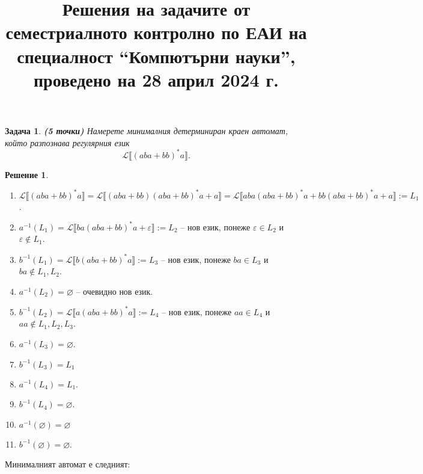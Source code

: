 \documentclass{article}
\newtheorem{problem}{Задача}
\theoremstyle{definition}
\newtheorem*{solution}{Решение}
\begin{document}
\title{Решения на задачите от семестриалното контролно по ЕАИ на специалност ``Компютърни науки'', проведено на 28 април 2024 г.}
\date{}

\newcommand{\N}{\mathbb{N}}
\newcommand{\A}{\mathcal{A}}
\newcommand{\calL}{\mathcal{L}}

\maketitle

\begin{problem} {\bf (5 точки)}
Намерете минималния детерминиран краен автомат, който разпознава регулярния език
\[
    \calL \llbracket (aba + bb)^* a \rrbracket.
\]
\end{problem}

\begin{solution}
    \phantom{}
    \begin{enumerate}
        \item $\calL \llbracket (aba + bb)^* a \rrbracket = \calL \llbracket (aba + bb)(aba + bb)^* a + a \rrbracket = \calL \llbracket aba(aba + bb)^* a + bb(aba + bb)^* a + a \rrbracket := L_1$.
        \item $a^{-1}(L_1) = \calL \llbracket ba(aba + bb)^* a + \varepsilon \rrbracket := L_2$ -- нов език, понеже $\varepsilon \in L_2$ и $\varepsilon \notin L_1$.
        \item $b^{-1}(L_1) = \calL \llbracket b(aba + bb)^* a \rrbracket := L_3$ -- нов език, понеже $ba \in L_3$ и $ba \notin L_1, L_2$.
        \item $a^{-1}(L_2) = \varnothing$ -- очевидно нов език.
        \item $b^{-1}(L_2) = \calL \llbracket a(aba + bb)^* a \rrbracket := L_4$ -- нов език, понеже $aa \in L_4$ и $aa \notin L_1, L_2, L_3$.
        \item $a^{-1}(L_3) = \varnothing$.
        \item $b^{-1}(L_3) = L_1$
        \item $a^{-1}(L_4) = L_1$.
        \item $b^{-1}(L_4) = \varnothing$.
        \item $a^{-1}(\varnothing) = \varnothing$
        \item $b^{-1}(\varnothing) = \varnothing$.
    \end{enumerate}
    Минималният автомат е следният:
    \begin{center}
        \begin{tikzpicture}[shorten >=1pt,node distance=2.5cm,>=stealth',thick]

\end{tikzpicture}
\end{center}
\end{solution}
\end{document}
